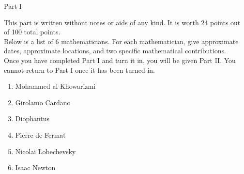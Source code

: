 \documentclass[11pt]{article}
\def\bc{\begin{center}}
\def\ec{\end{center}}
\def\be{\begin{enumerate}}
\def\ee{\end{enumerate}}
\begin{document}
\thispagestyle{fancy}

\vspace*{-0.3in}

\bc Part I \ec

This part is written without notes or aids of any kind. It is worth 24 points out of 100 total points. \\

Below is a list of 6 mathematicians. For each mathematician, give approximate dates, approximate locations, and two specific mathematical contributions. \\

Once you have completed Part I and turn it in, you will be given Part II. You cannot return to Part I once it has been turned in.\\

\be
\item Mohammed al-Khowarizmi
\vfill
\item Girolamo Cardano
\vfill
\item Diophantus
\vfill
\item Pierre de Fermat
\vfill
\item Nicolai Lobechevsky
\vfill
\item Isaac Newton
\vfill
\ee
\end{document}
